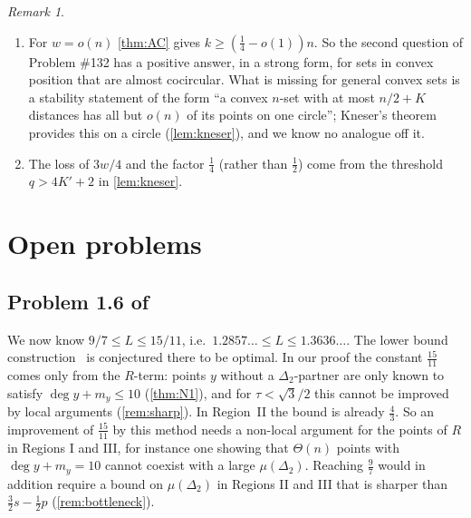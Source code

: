 \documentclass[11pt]{amsart}
\theoremstyle{definition}
\theoremstyle{remark}
\newtheorem{remark}[theorem]{Remark}
\newcommand{\Dt}{\Delta_2}
\newcommand{\mult}{\mu}
\begin{document}
\begin{remark}\label{rem:AC}
\begin{enumerate}[leftmargin=2em,label=(\alph*)]
\item For $w=o(n)$ \cref{thm:AC} gives $k\ge(\frac14-o(1))n$. So the second question of Problem \#132 has a positive answer, in a strong form, for sets in convex position that are almost cocircular. What is missing for general convex sets is a stability statement of the form ``a convex $n$-set with at most $n/2+K$ distances has all but $o(n)$ of its points on one circle''; Kneser's theorem provides this on a circle (\cref{lem:kneser}), and we know no analogue off it.
\item The loss of $3w/4$ and the factor $\frac14$ (rather than $\frac12$) come from the threshold $q>4K'+2$ in \cref{lem:kneser}.
\end{enumerate}
\end{remark}

\section{Open problems}\label{sec:open}

\subsection*{\texorpdfstring{Problem 1.6 of~\cite{CDL25}}{Problem 1.6 of CDL}}
We now know $9/7\le L\le15/11$, i.e.\ $1.2857\ldots\le L\le1.3636\ldots$. The lower bound construction~\cite{ienjoymath} is conjectured there to be optimal. In our proof the constant $\frac{15}{11}$ comes only from the $R$-term: points $y$ without a $\Dt$-partner are only known to satisfy $\deg y+m_y\le10$ (\cref{thm:N1}), and for $\tau<\sqrt3/2$ this cannot be improved by local arguments (\cref{rem:sharp}). In Region~II the bound is already $\frac43$. So an improvement of $\frac{15}{11}$ by this method needs a non-local argument for the points of $R$ in Regions I and III, for instance one showing that $\Theta(n)$ points with $\deg y+m_y=10$ cannot coexist with a large $\mult(\Dt)$. Reaching $\frac97$ would in addition require a bound on $\mult(\Dt)$ in Regions II and III that is sharper than $\frac32s-\frac12p$ (\cref{rem:bottleneck}).
\end{document}
